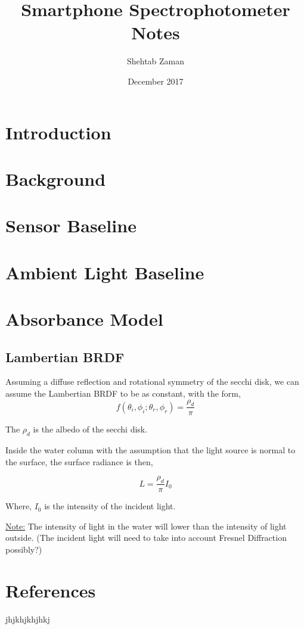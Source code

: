 \documentclass{article}
\title{Smartphone Spectrophotometer Notes}
\author{Shehtab Zaman }
\date{December 2017}
\begin{document}
\maketitle
\section{Introduction}

\section{Background}
\section{Sensor Baseline}
\section{Ambient Light Baseline}
\section{Absorbance Model}
\subsection{Lambertian BRDF}
Assuming a diffuse reflection and rotational symmetry of the
secchi disk, we can assume the Lambertian BRDF to be
as constant, with the form,
\[
f(\theta_i, \phi_i; \theta_r , \phi_r) = \frac{\rho_d}{\pi}
\]

The $\rho_d$ is the albedo of the secchi disk.

Inside the water column with the assumption that the light source is normal to the surface,
the surface radiance is then,

\[
L = \frac{\rho_d}{\pi} I_0
\]

Where, $I_0$ is the intensity of the incident light.

\underline{Note:} The intensity of light in the water will lower than
the intensity of light outside.
(The incident light will need to take into account Fresnel Diffraction possibly?)

\section{References}

\begin{thebibliography}{9}
  jhjkhjkhjhkj
\end{thebibliography}
\end{document}
